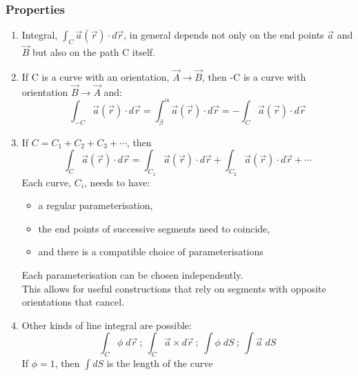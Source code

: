 \documentclass[a4paper, 11pt, normalem]{report}
\newcommand\veca{\vec{a}(\vec{r})}
\begin{document}
\subsection{Properties}
\begin{enumerate}
    \item Integral, $\int_C \veca \cdot d\vec{r}$, in general depends not only on the end points $\vec{a}$ and $\vec{B}$ but also on the path C itself.
    \item If C is a curve with an orientation, $\vec{A} \to \vec{B}$, then -C is a curve with orientation $\vec{B} \to \vec{A}$ and:
            \begin{equation*}
                \int_{-C} \veca \cdot d\vec{r} = \int_{\beta}^{\alpha} \veca \cdot d\vec{r} = -\int_C \veca \cdot d\vec{r}
            \end{equation*}
    \item If $C = C_1 + C_2 + C_3 + \cdots$, then
            \begin{equation*}
                \int_C \veca \cdot d\vec{r} = \int_{C_1} \veca \cdot d\vec{r} + \int_{C_2} \veca \cdot d\vec{r} + \cdots
            \end{equation*}
            Each curve, $C_i$, needs to have:
            \begin{itemize}
                \item a regular parameterisation,
                \item the end points of successive segments need to coincide,
                \item and there is a compatible choice of parameterisations
            \end{itemize}
            Each parameterisation can be chosen independently. \\
            This allows for useful constructions that rely on segments with opposite orientations that cancel.
    \item Other kinds of line integral are possible:
            \begin{equation*}
                \int_C \phi\;d\vec{r} ~;~ \int_C \vec{a} \times d\vec{r} ~;~ \int \phi\;dS ~;~ \int \vec{a}\;dS
            \end{equation*}
            If $\phi = 1$, then $\int dS$ is the length of the curve
\end{enumerate}

\chapter{}
\end{document}
